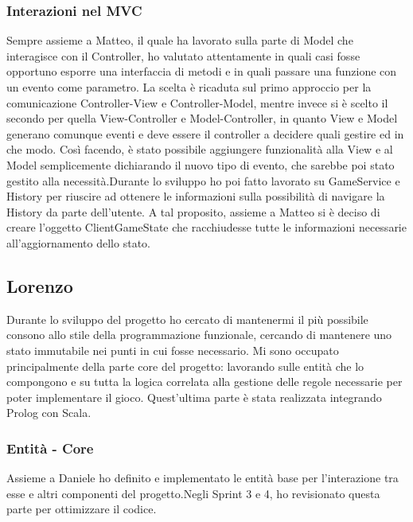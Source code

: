 \subsubsection{Interazioni nel MVC}
Sempre assieme a Matteo, il quale ha lavorato sulla parte di Model che interagisce con il Controller, ho valutato attentamente in quali casi fosse opportuno esporre una interfaccia di metodi e in quali passare una funzione con un evento come parametro. La scelta è ricaduta sul primo approccio per la comunicazione Controller-View e Controller-Model, mentre invece si è scelto il secondo per quella View-Controller e Model-Controller, in quanto View e Model generano comunque eventi e deve essere il controller a decidere quali gestire ed in che modo. Così facendo, è stato possibile aggiungere funzionalità alla View e al Model semplicemente dichiarando il nuovo tipo di evento, che sarebbe poi stato gestito alla necessità.\newline \newline Durante lo sviluppo ho poi fatto lavorato su GameService e History per riuscire ad ottenere le informazioni sulla possibilità di navigare la History da parte dell’utente. A tal proposito, assieme a Matteo si è deciso di creare l’oggetto ClientGameState che racchiudesse tutte le informazioni necessarie all’aggiornamento dello stato.
\subsection{Lorenzo}
Durante lo sviluppo del progetto ho cercato di mantenermi il più possibile consono allo stile della programmazione funzionale, cercando di mantenere uno stato immutabile nei punti in cui fosse necessario. \newline \newline Mi sono occupato principalmente della parte core del progetto: lavorando sulle entità che lo compongono e su tutta la logica correlata alla gestione delle regole necessarie per poter implementare il gioco. Quest’ultima parte è stata realizzata integrando Prolog con Scala.
\subsubsection{Entità - Core}
Assieme a Daniele ho definito e implementato le entità base per l’interazione tra esse e altri componenti del progetto.\newline Negli Sprint 3 e 4, ho revisionato questa parte per ottimizzare il codice.
